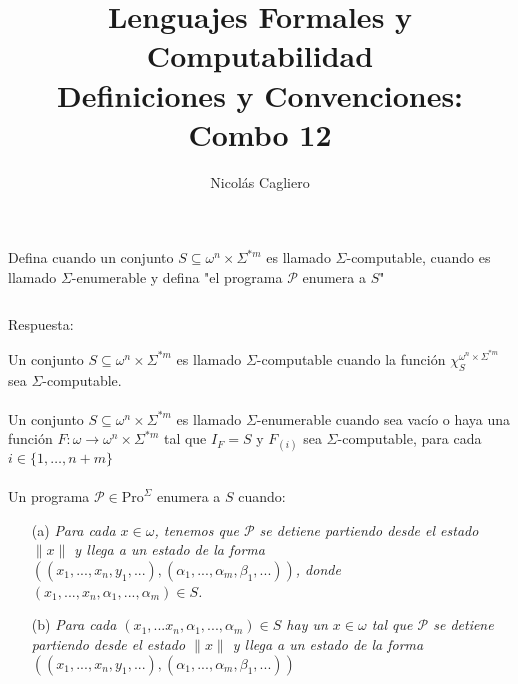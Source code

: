 \documentclass{article}
\title{Lenguajes Formales y Computabilidad \\
        \large Definiciones y Convenciones: Combo 12 }
\author{Nicolás Cagliero}
\begin{document}
\maketitle

Defina cuando un conjunto $S \subseteq \omega^n \times \Sigma^{*m}$ es llamado
$\Sigma$-computable, cuando es llamado $\Sigma$-enumerable y defina 
"el programa $\mathcal{P}$ enumera a $S$"

\(\)
\begin{center}
    Respuesta: 
    \(\)
\end{center}

Un conjunto $S \subseteq \omega^n \times \Sigma^{*m}$ es llamado
$\Sigma$-computable cuando la función $\chi_S^{\omega^n \times \Sigma^{*m}}$ sea $\Sigma$-computable.\\
\\

Un conjunto $S \subseteq \omega^n \times \Sigma^{*m}$ es llamado $\Sigma$-enumerable
cuando sea vacío o haya una función $F : \omega \rightarrow \omega^n \times \Sigma^{*m}$
tal que $I_F = S$ y $F_(i)$ sea $\Sigma$-computable, para cada $i \in \{1, \dots, n + m\}$\\
\\

Un programa $\mathcal{P} \in \text{Pro}^{\Sigma}$  enumera a $S$ cuando:
\begin{itemize}
  \item[(a)] \textit{Para cada $x \in \omega$, tenemos que $\mathcal{P}$ se detiene partiendo desde el estado $\|x\|$ y llega a un estado de la forma $((x_1, ..., x_n, y_1, ...), (\alpha_1, ..., \alpha_m, \beta_1, ...))$, donde $(x_1, ..., x_n, \alpha_1, ..., \alpha_m) \in S$.}
  
  \item[(b)] \textit{Para cada $(x_1, ... x_n, \alpha_1, ..., \alpha_m) \in S$ hay un $x \in \omega$ tal que $\mathcal{P}$ se detiene partiendo desde el estado $\|x\|$ y llega a un estado de la forma}\\
  \textit{$((x_1, ..., x_n, y_1, ...), (\alpha_1, ..., \alpha_m, \beta_1, ...))$} 
\end{itemize}
\end{document}
